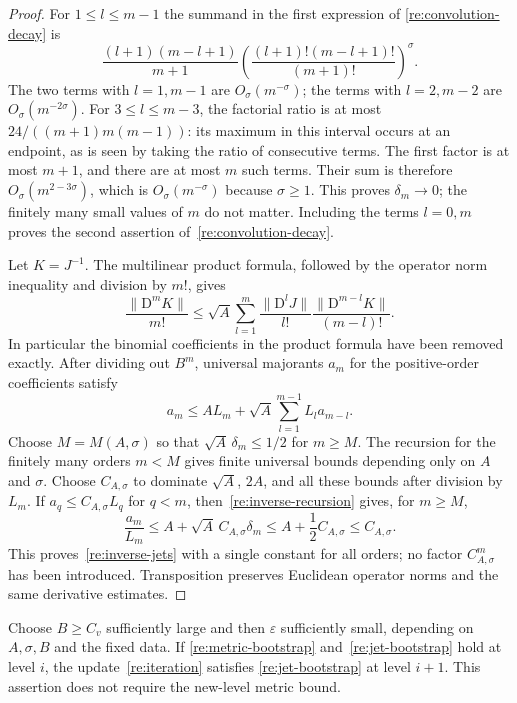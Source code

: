 \begin{proof}
For $1\le l\le m-1$ the summand in the first expression of
\eqref{re:convolution-decay} is
\[
 \frac{(l+1)(m-l+1)}{m+1}
 \left(\frac{(l+1)!(m-l+1)!}{(m+1)!}\right)^\sigma.
\]
The two terms with $l=1,m-1$ are $O_\sigma(m^{-\sigma})$;
the terms with $l=2,m-2$ are $O_\sigma(m^{-2\sigma})$.
For $3\le l\le m-3$, the factorial ratio is at most
$24/((m+1)m(m-1))$: its maximum in this interval occurs at an
endpoint, as is seen by taking the ratio of consecutive terms.
The first factor is at most $m+1$, and there are at most $m$ such
terms.  Their sum is therefore $O_\sigma(m^{2-3\sigma})$,
which is $O_\sigma(m^{-\sigma})$ because $\sigma\ge1$.
This proves $\delta_m\to0$; the finitely many small values of $m$
do not matter.  Including the terms $l=0,m$ proves the second
assertion of~\eqref{re:convolution-decay}.

Let $K=J^{-1}$.  The multilinear product formula, followed by the
operator norm inequality and division by $m!$, gives
\[
 \frac{\|\mathrm D^m K\|}{m!}
 \le\sqrt A\sum_{l=1}^m
        \frac{\|\mathrm D^l J\|}{l!}
        \frac{\|\mathrm D^{m-l}K\|}{(m-l)!}.
\]
In particular the binomial coefficients in the product formula have
been removed exactly.  After dividing out $B^m$, universal majorants
$a_m$ for the positive-order coefficients satisfy
\begin{equation}
 \label{re:inverse-recursion}
 a_m\le A L_m+\sqrt A
                    \sum_{l=1}^{m-1}L_l a_{m-l}.
\end{equation}
Choose $M=M(A,\sigma)$ so that $\sqrt A\,\delta_m\le1/2$ for
$m\ge M$.  The recursion for the finitely many orders $m<M$
gives finite universal bounds depending only on $A$ and $\sigma$.
Choose $C_{A,\sigma}$ to dominate $\sqrt A$, $2A$, and all these
bounds after division by $L_m$.  If $a_q\le C_{A,\sigma}L_q$
for $q<m$, then~\eqref{re:inverse-recursion} gives, for $m\ge M$,
\[
 \frac{a_m}{L_m}
       \le A+\sqrt A\,C_{A,\sigma}\delta_m
       \le A+\frac12 C_{A,\sigma}
       \le C_{A,\sigma}.
\]
This proves~\eqref{re:inverse-jets} with a single constant for all
orders; no factor $C_{A,\sigma}^m$ has been introduced.  Transposition
preserves Euclidean operator norms and the same derivative estimates.
\end{proof}

\begin{lemma}
 \label{re:jet-step}
Choose $B\ge C_v$ sufficiently large and then $\varepsilon$ sufficiently
small, depending on $A,\sigma,B$ and the fixed data.  If
\eqref{re:metric-bootstrap} and~\eqref{re:jet-bootstrap} hold at level
$i$, the update~\eqref{re:iteration} satisfies
\eqref{re:jet-bootstrap} at level $i+1$.  This assertion does not
require the new-level metric bound.
\end{lemma}

